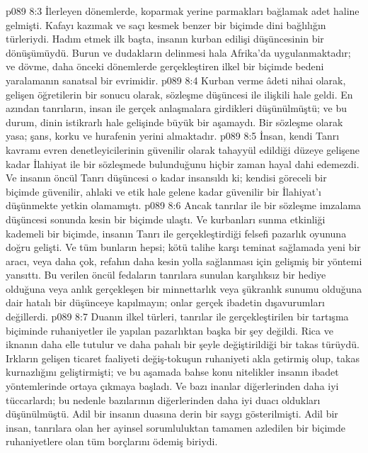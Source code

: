 \vs p089 8:3 İlerleyen dönemlerde, koparmak yerine parmakları bağlamak adet haline gelmişti. Kafayı kazımak ve saçı kesmek benzer bir biçimde dini bağlılığın türleriydi. Hadım etmek ilk başta, insanın kurban edilişi düşüncesinin bir dönüşümüydü. Burun ve dudakların delinmesi hala Afrika’da uygulanmaktadır; ve dövme, daha önceki dönemlerde gerçekleştiren ilkel bir biçimde bedeni yaralamanın sanatsal bir evrimidir.
\vs p089 8:4 Kurban verme âdeti nihai olarak, gelişen öğretilerin bir sonucu olarak, sözleşme düşüncesi ile ilişkili hale geldi. En azından tanrıların, insan ile gerçek anlaşmalara girdikleri düşünülmüştü; ve bu durum, dinin istikrarlı hale gelişinde büyük bir aşamaydı. Bir sözleşme olarak yasa; şans, korku ve hurafenin yerini almaktadır.
\vs p089 8:5 İnsan, kendi Tanrı kavramı evren denetleyicilerinin güvenilir olarak tahayyül edildiği düzeye gelişene kadar İlahiyat ile bir sözleşmede bulunduğunu hiçbir zaman hayal dahi edemezdi. Ve insanın öncül Tanrı düşüncesi o kadar insansıldı ki; kendisi göreceli bir biçimde güvenilir, ahlaki ve etik hale gelene kadar güvenilir bir İlahiyat’ı düşünmekte yetkin olamamıştı.
\vs p089 8:6 Ancak tanrılar ile bir sözleşme imzalama düşüncesi sonunda kesin bir biçimde ulaştı.  Ve kurbanları sunma etkinliği kademeli bir biçimde, insanın Tanrı ile gerçekleştirdiği felsefi pazarlık oyununa doğru gelişti. Ve tüm bunların hepsi; kötü talihe karşı teminat sağlamada yeni bir aracı, veya daha çok, refahın daha kesin yolla sağlanması için gelişmiş bir yöntemi yansıttı. Bu verilen öncül fedaların tanrılara sunulan karşılıksız bir hediye olduğuna veya anlık gerçekleşen bir minnettarlık veya şükranlık sunumu olduğuna dair hatalı bir düşünceye kapılmayın; onlar gerçek ibadetin dışavurumları değillerdi.
\vs p089 8:7 Duanın ilkel türleri, tanrılar ile gerçekleştirilen bir tartışma biçiminde ruhaniyetler ile yapılan pazarlıktan başka bir şey değildi. Rica ve iknanın daha elle tutulur ve daha pahalı bir şeyle değiştirildiği bir takas türüydü. Irkların gelişen ticaret faaliyeti değiş\hyp{}tokuşun ruhaniyeti akla getirmiş olup, takas kurnazlığını geliştirmişti; ve bu aşamada bahse konu nitelikler insanın ibadet yöntemlerinde ortaya çıkmaya başladı. Ve bazı inanlar diğerlerinden daha iyi tüccarlardı; bu nedenle bazılarının diğerlerinden daha iyi duacı oldukları düşünülmüştü. Adil bir insanın duasına derin bir saygı gösterilmişti. Adil bir insan, tanrılara olan her ayinsel sorumluluktan tamamen azledilen bir biçimde ruhaniyetlere olan tüm borçlarını ödemiş biriydi.
